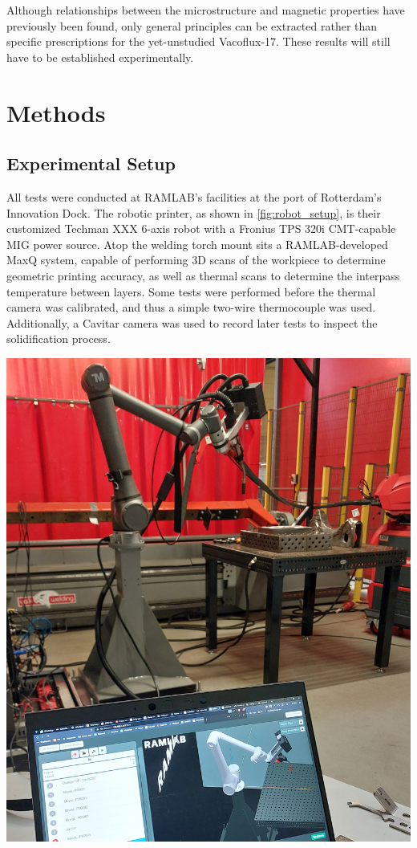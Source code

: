 Although relationships between the microstructure and magnetic properties have previously been found, only general principles can be extracted rather than specific prescriptions for the yet-unstudied Vacoflux-17. These results will still have to be established experimentally.


\section{Methods}

\subsection{Experimental Setup}

All tests were conducted at RAMLAB's facilities at the port of Rotterdam's Innovation Dock. The robotic printer, as shown in \autoref{fig:robot_setup}, is their customized Techman XXX 6-axis robot with a Fronius TPS 320i CMT-capable MIG power source.
Atop the welding torch mount sits a RAMLAB-developed MaxQ system, capable of performing 3D scans of the workpiece to determine geometric printing accuracy, as well as thermal scans to determine the interpass temperature between layers. Some tests were performed before the thermal camera was calibrated, and thus a simple two-wire thermocouple was used.
Additionally, a Cavitar camera was used to record later tests to inspect the solidification process.

\begin{minipage}{\linewidth}
      \centering
      \includegraphics[width=\linewidth]{images/robot_setup.jpg}
      \label{fig:robot_setup}
  \end{minipage}


